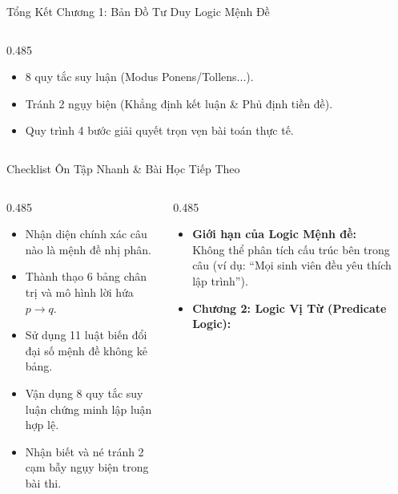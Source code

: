 \documentclass[aspectratio=169, 10pt]{beamer}
\begin{document}
\begin{frame}{Tổng Kết Chương 1: Bản Đồ Tư Duy Logic Mệnh Đề}
\begin{columns}[t, onlytextwidth]
\begin{column}{0.485\textwidth}
\begin{cozyTrap}
        \footnotesize
        \begin{itemize}
          \setlength{\itemsep}{0.5pt}
          \item 8 quy tắc suy luận (Modus Ponens/Tollens...).
          \item Tránh 2 ngụy biện (Khẳng định kết luận \& Phủ định tiền đề).
          \item Quy trình 4 bước giải quyết trọn vẹn bài toán thực tế.
        \end{itemize}
      \end{cozyTrap}
    \end{column}
  \end{columns}
\end{frame}

\begin{frame}{Checklist Ôn Tập Nhanh \& Bài Học Tiếp Theo}
  \begin{columns}[t, onlytextwidth]
    \begin{column}{0.485\textwidth}
      \begin{cozyMethod}
        \small
        \begin{itemize}
          \setlength{\itemsep}{1.5pt}
          \item[$\boxtimes$] Nhận diện chính xác câu nào là mệnh đề nhị phân.
          \item[$\boxtimes$] Thành thạo 6 bảng chân trị và mô hình lời hứa $p \to q$.
          \item[$\boxtimes$] Sử dụng 11 luật biến đổi đại số mệnh đề không kẻ bảng.
          \item[$\boxtimes$] Vận dụng 8 quy tắc suy luận chứng minh lập luận hợp lệ.
          \item[$\boxtimes$] Nhận biết và né tránh 2 cạm bẫy ngụy biện trong bài thi.
        \end{itemize}
      \end{cozyMethod}
    \end{column}
    \begin{column}{0.485\textwidth}
      \begin{cozyInsight}
        \small
        \begin{itemize}
          \setlength{\itemsep}{1.5pt}
          \item \textbf{Giới hạn của Logic Mệnh đề:}\\
          Không thể phân tích cấu trúc bên trong câu (ví dụ: ``Mọi sinh viên đều yêu thích lập trình'').
          \item \textbf{Chương 2: Logic Vị Từ (Predicate Logic):}

\end{itemize}
\end{cozyInsight}
\end{column}
\end{columns}
\end{frame}
\end{document}
